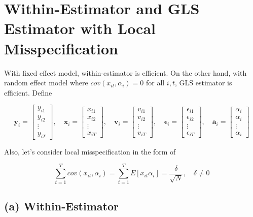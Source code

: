 \documentclass[11pt]{article}
\begin{document}
\vspace{0.2in}

\section*{Within-Estimator and GLS Estimator with Local Misspecification}

With fixed effect model, within-estimator is efficient. On the other hand, with random effect model where $cov(x_{it}, \alpha_i)=0$ for all $i, t$, GLS estimator is efficient. Define

\[
\mathbf{y}_i =
\begin{bmatrix}
y_{i1}\\ 
y_{i2}\\ 
\vdots\\ 
y_{iT}
\end{bmatrix}, \quad 
\mathbf{x}_i =
\begin{bmatrix}
x_{i1}\\ 
x_{i2}\\ 
\vdots\\ 
x_{iT}
\end{bmatrix}, \quad 
\mathbf{v}_i=
\begin{bmatrix}
v_{i1}\\ 
v_{i2}\\ 
\vdots\\ 
v_{iT}
\end{bmatrix}, \quad 
\mathbf{\epsilon}_i=
\begin{bmatrix}
\epsilon_{i1}\\ 
\epsilon_{i2}\\ 
\vdots\\ 
\epsilon_{iT}
\end{bmatrix}, \quad
\mathbf{a}_i=
\begin{bmatrix}
\alpha_i\\ 
\alpha_i\\ 
\vdots\\ 
\alpha_i
\end{bmatrix}
\]
 
\vspace{0.2in}

Also, let's consider local misspecification in the form of

\[
\sum_{t=1}^{T} cov(x_{it}, \alpha_i) = \sum_{t=1}^T E[x_{it}\alpha_i] = \frac{\delta}{\sqrt{N}}, \quad \delta \neq 0
\]

\vspace{0.2in}

\subsection*{(a) Within-Estimator}
\end{document}
